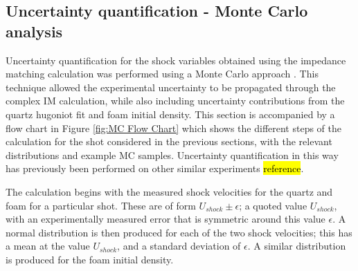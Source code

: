 \subsection{Uncertainty quantification - Monte Carlo analysis} \label{MC error}

Uncertainty quantification for the shock variables obtained using the impedance matching calculation was performed using a Monte Carlo approach \cite{Root2010}. This technique allowed the experimental uncertainty to be propagated through the complex IM calculation, while also including uncertainty contributions from the quartz hugoniot fit and foam initial density. This section is accompanied by a flow chart in Figure \ref{fig:MC Flow Chart} which shows the different steps of the calculation for the shot considered in the previous sections, with the relevant distributions and example MC samples. Uncertainty quantification in this way has previously been performed on other similar experiments \hl{reference}.


The calculation begins with the measured shock velocities for the quartz and foam for a particular shot. These are of form $U_{shock} \pm \epsilon$; a quoted value $U_{shock}$, with an experimentally measured error that is symmetric around this value $\epsilon$. A normal distribution is then produced for each of the two shock velocities; this has a mean at the value $U_{shock}$, and a standard deviation of $\epsilon$. A similar distribution is produced for the foam initial density.

